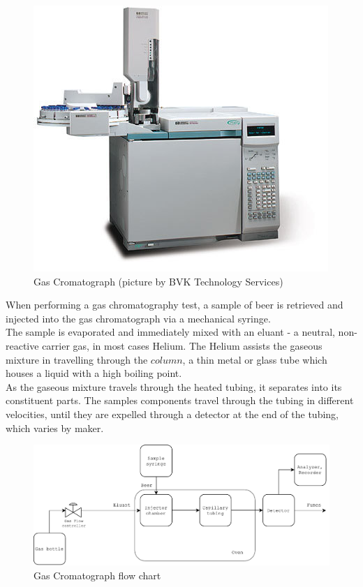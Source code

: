 \documentclass[twoside]{ctuthesis}
\theoremstyle{plain}
\theoremstyle{definition}
\theoremstyle{note}
\begin{document}
\begin{figure}[H]
	\centering
	\includegraphics[scale = 0.4]{refurbished-gas_chromatograph}
	\caption{Gas Cromatograph (picture by BVK Technology Services)}
\end{figure}

When performing a gas chromatography test, a sample of beer is retrieved and injected into the gas chromatograph via a mechanical syringe. \\
The sample is evaporated and immediately mixed with an eluant - a neutral, non-reactive carrier gas, in most cases Helium. The Helium assists the gaseous mixture in travelling through the $column$, a thin metal or glass tube which houses a liquid with a high boiling point. \\
As the gaseous mixture travels through the heated tubing, it separates into its constituent parts. The samples components travel through the tubing in different velocities, until they are expelled through a detector at the end of the tubing, which varies by maker.

\begin{figure}[H]
	\centering
	\includegraphics[width = \textwidth]{Gas_Chromatograph_PDF}
	\caption{Gas Cromatograph flow chart}
\end{figure}
\end{document}
